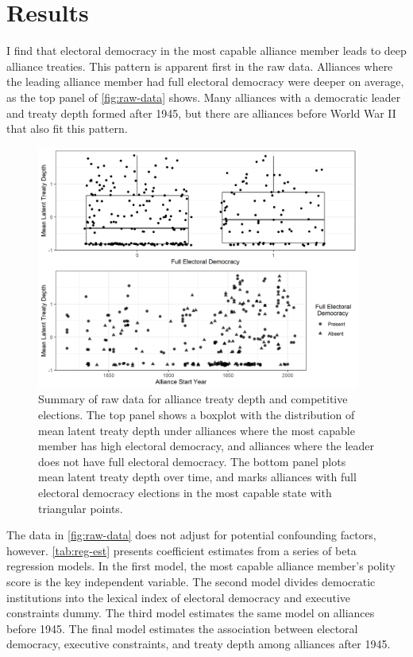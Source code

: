 \documentclass[12pt]{article}
\begin{document}
\section{Results}


I find that electoral democracy in the most capable alliance member leads to deep alliance treaties. 
This pattern is apparent first in the raw data. 
Alliances where the leading alliance member had full electoral democracy were deeper on average, as the top panel of \autoref{fig:raw-data} shows. 
Many alliances with a democratic leader and treaty depth formed after 1945, but there are alliances before World War II that also fit this pattern. 

\begin{figure}[hbtp]
\centering
\includegraphics[width=0.95\textwidth]{../figures/raw-data.png}
\caption{Summary of raw data for alliance treaty depth and competitive elections. The top panel shows a boxplot with the distribution of mean latent treaty depth under alliances where the most capable member has high electoral democracy, and alliances where the leader does not have full electoral democracy. The bottom panel plots mean latent treaty depth over time, and marks alliances with full electoral democracy elections in the most capable state with triangular points. }
\label{fig:raw-data}
\end{figure}


The data in \autoref{fig:raw-data} does not adjust for potential confounding factors, however. 
\autoref{tab:reg-est} presents coefficient estimates from a series of beta regression models. 
In the first model, the most capable alliance member's polity score is the key independent variable. 
The second model divides democratic institutions into the lexical index of electoral democracy and executive constraints dummy.  
The third model estimates the same model on alliances before 1945. 
The final model estimates the association between electoral democracy, executive constraints, and treaty depth among alliances after 1945. 
\end{document}
